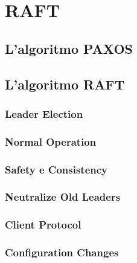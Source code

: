 \chapter{RAFT}
	
	\section{L'algoritmo PAXOS}
	\section{L'algoritmo RAFT}
		\subsection{Leader Election}
		\subsection{Normal Operation}
		\subsection{Safety e Consistency}
		\subsection{Neutralize Old Leaders}
		\subsection{Client Protocol}
		\subsection{Configuration Changes}